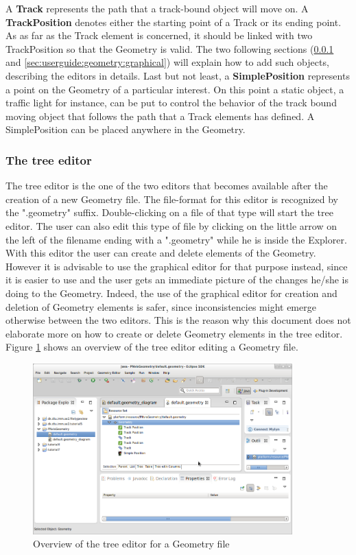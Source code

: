 A \textbf{Track} represents the path that a track-bound object will move on. A \textbf{TrackPosition} denotes either the starting point of a Track or its ending point. As as far as the Track element is concerned, it should be linked with two TrackPosition so that the Geometry is valid. The two following sections (\ref{sec:userguide:geometry:tree} and \ref{sec:userguide:geometry:graphical}) will explain how to add such objects, describing the editors in details. Last but not least, a \textbf{SimplePosition} represents a point on the Geometry of a particular interest. On this point a static object, a traffic light for instance, can be put to control the behavior of the track bound moving object that follows the path that a Track elements has defined. A SimplePosition can be placed anywhere in the Geometry. 

\subsubsection{The tree editor}
\label{sec:userguide:geometry:tree}
The tree editor is the one of the two editors that becomes available after the creation of a new Geometry file. The file-format for this editor is recognized by the ".geometry" suffix. Double-clicking on a file of that type will start the tree editor. The user can also edit this type of file by clicking on the little arrow on the left of the filename ending with a ".geometry" while he is inside the Explorer. With this editor the user can create and delete elements of the Geometry. However it is advisable to use the graphical editor for that purpose instead, since it is easier to use and the user gets an immediate picture of the changes he/she is doing to the Geometry. Indeed, the use of the graphical editor for creation and deletion of Geometry elements is safer, since inconsistencies might emerge otherwise between the two editors. This is the reason why this document does not elaborate more on how to create or delete Geometry elements in the tree editor. Figure \ref{fig:geo_tree_editor} shows an overview of the tree editor editing a Geometry file.

\begin{figure}[htp]
\begin{center}
  \includegraphics[width=10.0cm]{image/geo_tree_editor.png}
  \caption{Overview of the tree editor for a Geometry file}
  \label{fig:geo_tree_editor}
\end{center}
\end{figure}

